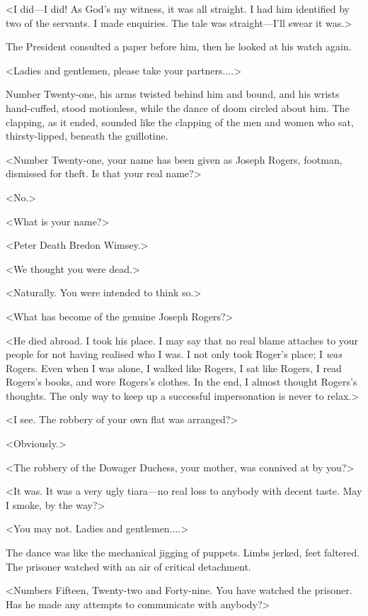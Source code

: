 <I did—I did! As God's my witness, it was all straight. I had him identified by two of the servants. I made enquiries. The tale was straight—I'll swear it was.>

The President consulted a paper before him, then he looked at his watch again.

<Ladies and gentlemen, please take your partners....>

Number Twenty-one, his arms twisted behind him and bound, and his wrists hand-cuffed, stood motionless, while the dance of doom circled about him. The clapping, as it ended, sounded like the clapping of the men and women who sat, thirsty-lipped, beneath the guillotine.

<Number Twenty-one, your name has been given as Joseph Rogers, footman, dismissed for theft. Is that your real name?>

<No.>

<What is your name?>

<Peter Death Bredon Wimsey.>

<We thought you were dead.>

<Naturally. You were intended to think so.>

<What has become of the genuine Joseph Rogers?>

<He died abroad. I took his place. I may say that no real blame attaches to your people for not having realised who I was. I not only took Roger's place; I \textit{was} Rogers. Even when I was alone, I walked like Rogers, I sat like Rogers, I read Rogers's books, and wore Rogers's clothes. In the end, I almost thought Rogers's thoughts. The only way to keep up a successful impersonation is never to relax.>

<I see. The robbery of your own flat was arranged?>

<Obviously.>

<The robbery of the Dowager Duchess, your mother, was connived at by you?>

<It was. It was a very ugly tiara—no real loss to anybody with decent taste. May I smoke, by the way?>

<You may not. Ladies and gentlemen....>

The dance was like the mechanical jigging of puppets. Limbs jerked, feet faltered. The prisoner watched with an air of critical detachment.

<Numbers Fifteen, Twenty-two and Forty-nine. You have watched the prisoner. Has he made any attempts to communicate with anybody?>

